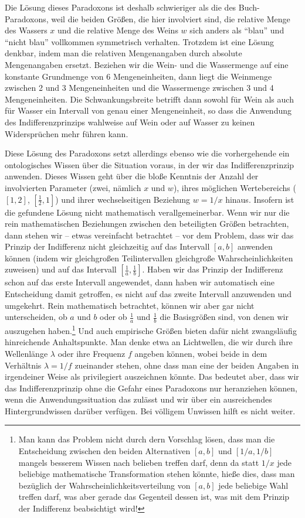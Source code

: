 Die Lösung dieses Paradoxons ist deshalb schwieriger als die des
Buch-Paradoxons, weil die beiden Größen, die hier involviert sind, die relative
Menge des Wassers $x$ und die relative Menge des Weins $w$ sich anders als
"`blau"' und "`nicht blau"' vollkommen symmetrisch verhalten. Trotzdem ist
eine Lösung denkbar, indem man die relativen Mengenangaben durch absolute
Mengenangaben ersetzt. Beziehen wir die Wein- und die Wassermenge auf eine
konstante Grundmenge von 6 Mengeneinheiten, dann liegt die Weinmenge zwischen 2
und 3 Mengeneinheiten und die Wassermenge zwischen 3 und 4 Mengeneinheiten. Die
Schwankungsbreite betrifft dann sowohl für Wein als auch für Wasser ein
Intervall von genau einer Mengeneinheit, so dass die Anwendung des
Indifferenzprinzips wahlweise auf Wein oder auf Wasser zu keinen Widersprüchen
mehr führen kann. 

Diese Lösung des Paradoxons setzt allerdings ebenso wie die vorhergehende ein
ontologisches Wissen über die Situation voraus, in der wir das Indifferenzprinzip
anwenden. Dieses Wissen geht über die bloße Kenntnis der Anzahl der involvierten
Parameter (zwei, nämlich $x$ und $w$), ihres möglichen Wertebereichs ($[1, 2]$,
$[\frac{1}{2}, 1]$) und ihrer wechselseitigen Beziehung $w = 1/x$ hinaus.
Insofern ist die gefundene Lösung nicht mathematisch verallgemeinerbar. Wenn wir
nur die rein mathematischen Beziehungen zwischen den beteiligten Größen
betrachten, dann stehen wir -- etwas vereinfacht betrachtet -- vor dem Problem,
dass wir das Prinzip der Indifferenz nicht gleichzeitig auf das Intervall $[a,b]$
anwenden können (indem wir gleichgroßen Teilintervallen gleichgroße
Wahrscheinlichkeiten zuweisen) und auf das Intervall $[\frac{1}{a},
\frac{1}{b}]$. Haben wir das Prinzip der Indifferenz schon auf das erste
Intervall angewendet, dann haben wir automatisch eine Entscheidung damit
getroffen, es nicht auf das zweite Intervall anzuwenden und umgekehrt. Rein
mathematisch betrachtet, können wir aber gar nicht unterscheiden, ob $a$ und $b$
oder ob $\frac{1}{a}$ und $\frac{1}{b}$ die Basisgrößen sind, von denen wir
auszugehen haben.\footnote{Man kann das Problem nicht durch dern Vorschlag lösen,
dass man die Entscheidung zwischen den beiden Alternativen $[a,b]$ und
$[1/a,1/b]$ mangels besserem Wissen nach belieben treffen darf, denn da statt
$1/x$ jede beliebige mathematische Transformation stehen könnte, hieße dies, dass
man bezüglich der Wahrscheinlichkeitsverteilung von $[a,b]$ jede beliebige Wahl
treffen darf, was aber gerade das Gegenteil dessen ist, was mit dem Prinzip der
Indifferenz beabsichtigt wird!} Und auch empirische Größen bieten dafür nicht
zwangsläufig hinreichende Anhaltspunkte. Man denke etwa an Lichtwellen, die wir
durch ihre Wellenlänge $\lambda$ oder ihre Frequenz $f$ angeben können, wobei
beide in dem Verhältnis $\lambda = 1/f$ zueinander stehen, ohne dass man eine der
beiden Angaben in irgendeiner Weise als privilegiert auszeichnen könnte. Das
bedeutet aber, dass wir das Indifferenzprinzip ohne die Gefahr eines Paradoxons
nur heranziehen können, wenn die Anwendungssituation das zulässt und wir über ein
ausreichendes Hintergrundwissen darüber verfügen. Bei völligem Unwissen hilft es
nicht weiter.

